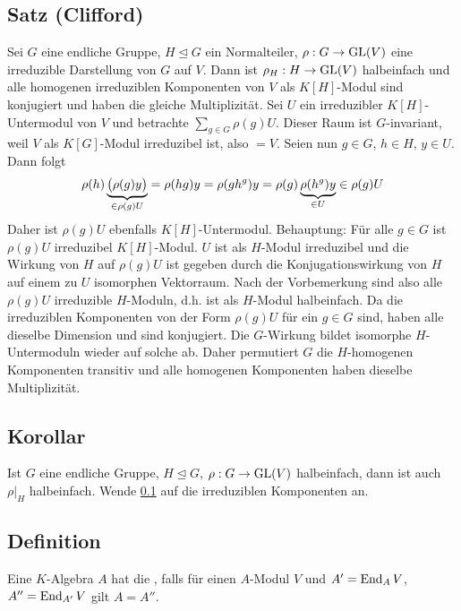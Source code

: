 \subsection{Satz (Clifford)} %
\label{sub:47}
Sei $G$ eine endliche Gruppe, $H \unlhd G$ ein Normalteiler, $\rho : G \to \GL(V)$ eine irreduzible Darstellung von $G$ auf $V$. Dann ist $\rho_H : H \to\GL(V)$ halbeinfach 
und alle homogenen irreduziblen Komponenten von $V$ als $K[H]$-Modul sind konjugiert und haben die gleiche Multiplizität.
Sei $U$ ein irreduzibler $K[H]$-Untermodul von $V$ und betrachte $\sum_{g \in G} \rho(g) U$. Dieser Raum ist $G$-invariant, weil $V$ als $K[G]$-Modul irreduzibel ist, also 
$= V$. Seien nun $g \in G$, $h \in H$, $y \in U$. Dann folgt 
\[
	\rho(h) \underbrace{\enbrace[\big]{\rho(g)y}}_{\in \rho(g) U} = \rho(h g) y = \rho(g h^g) y = \rho(g) \underbrace{\rho(h^g)y}_{\in U} \in \rho(g) U
\]
Daher ist $\rho(g) U$ ebenfalls $K[H]$-Untermodul. Behauptung: Für alle $g \in G$ ist $\rho(g)U$ irreduzibel $K[H]$-Modul. $U$ ist als $H$-Modul irreduzibel und die Wirkung
von $H$ auf $\rho(g)U$ ist gegeben durch die Konjugationswirkung von $H$ auf einem zu $U$ isomorphen Vektorraum. Nach der Vorbemerkung sind also alle $\rho(g) U$ 
irreduzible  $H$-Moduln, d.h. ist als $H$-Modul halbeinfach. Da die irreduziblen Komponenten von der Form $\rho(g) U$ für ein $g \in G$ sind, haben alle dieselbe Dimension
und sind konjugiert.
Die $G$-Wirkung bildet isomorphe $H$-Untermoduln wieder auf solche ab. Daher permutiert $G$ die $H$-homogenen Komponenten transitiv und alle homogenen Komponenten haben 
dieselbe Multiplizität. \bewende

\subsection{Korollar} %
\label{sub:48}
Ist $G$ eine endliche Gruppe, $H \unlhd G$, $\rho : G \to \GL(V)$ halbeinfach, dann ist auch $\rho \big|_H$ halbeinfach.
Wende \ref{sub:47} auf die irreduziblen Komponenten an. \bewende

\subsection[Definition: Doppelzentralisatoreigenschaft]{Definition} %
\label{sub:49}
Eine $K$-Algebra $A$ hat die , falls für einen $A$-Modul $V$ und $A' = \End_A V$, $A'' = \End_{A'} V$ gilt $A= A''$.

